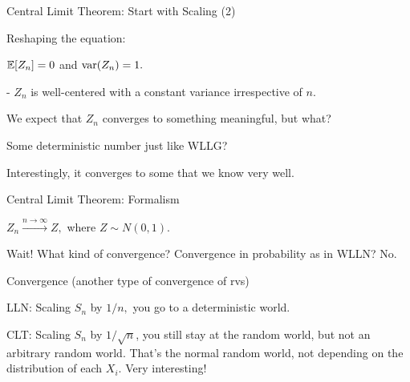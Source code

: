 \documentclass[fleqn,aspectratio=169]{beamer}
\begin{document}
\begin{frame}{Central Limit Theorem: Start with Scaling (2)}

\plitemsep 0.1in
\bci 
\item Reshaping the equation:

\item<4-> $\mathbb{E}[ Z_n ] = 0$ and $\text{var}( Z_n ) = 1.$ 

- $Z_n$ is well-centered with a constant variance irrespective of $n.$

\item<5-> We expect that $Z_n$ converges to something meaningful, but what?

\item<6-> Some deterministic number just like WLLG? 

\item<7-> Interestingly, it converges to some  that we know very well. 
\eci 
\end{frame}

\begin{frame}{Central Limit Theorem: Formalism}

\plitemsep 0.05in
\bci 
\item<2-> $Z_n \xrightarrow{n \rightarrow \infty} Z,$ where $Z \sim N(0,1).$

\item<3-> Wait! What kind of convergence? Convergence in probability as in WLLN? No.

\item<4-> Convergence  (another type of convergence of rvs)

\item<6->  
\bci
\item<7-> LLN: Scaling $S_n$ by $1/n,$ you go to a deterministic world.
\item<8-> CLT: Scaling $S_n$ by $1/\sqrt{n}$, you still stay at the random world, but not an arbitrary random world. That's the normal random world, not depending on the distribution of each $X_i.$ Very interesting! 
\eci

\eci 
\end{frame}
\end{document}
